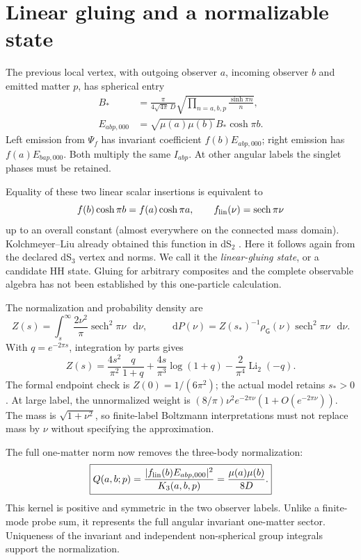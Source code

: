 \documentclass[11pt,a4paper]{article}
\newcommand{\dd}{\mathop{}\!\mathrm d}
\newcommand{\sech}{\operatorname{sech}}
\begin{document}
\newpage
\section{Linear gluing and a normalizable state}
The previous local vertex, with outgoing observer $a$, incoming observer
$b$ and emitted matter $p$, has spherical entry
\begin{align}
 B_*&=\frac{\pi}{4\sqrt{4\pi}\,D}
          \sqrt{\prod_{n=a,b,p}\frac{\sinh\pi n}{n}},\\
 E_{abp,000}&=\sqrt{\mu(a)\mu(b)}B_*\cosh\pi b .
\end{align}
Left emission from $\Psi_f$ has invariant coefficient $f(b)E_{abp,000}$;
right emission has $f(a)E_{bap,000}$. Both multiply the same $I_{abp}$.
At other angular labels the singlet phases must be retained.

Equality of these two linear scalar insertions is equivalent to
\begin{equation}
 f(b)\cosh\pi b=f(a)\cosh\pi a,\qquad
 f_{\rm lin}(\nu)=\sech\pi\nu
\end{equation}
up to an overall constant (almost everywhere on the connected mass domain).
Kolchmeyer--Liu already obtained this function in dS$_2$ \cite{KL}.
Here it follows again from the declared dS$_3$ vertex and norms.
We call it the \emph{linear-gluing state}, or a candidate HH state.
Gluing for arbitrary composites and the complete observable algebra has
not been established by this one-particle calculation.

The normalization and probability density are
\begin{equation}
 Z(s)=\int_s^\infty\frac{2\nu^2}{\pi}\sech^2\pi\nu\,\dd\nu,\qquad
 \dd P(\nu)=Z(s_*)^{-1}\rho_{\mathsf G}(\nu)\sech^2\pi\nu\,\dd\nu .
\end{equation}
With $q=e^{-2\pi s}$, integration by parts gives
\begin{equation}
 Z(s)=\frac{4s^2}{\pi^2}\frac{q}{1+q}
      +\frac{4s}{\pi^3}\log(1+q)
      -\frac{2}{\pi^4}\operatorname{Li}_2(-q).
\end{equation}
The formal endpoint check is $Z(0)=1/(6\pi^2)$; the actual model retains
$s_*>0$. At large label, the unnormalized weight is
$(8/\pi)\nu^2e^{-2\pi\nu}(1+O(e^{-2\pi\nu}))$.
The mass is $\sqrt{1+\nu^2}$, so finite-label Boltzmann interpretations
must not replace mass by $\nu$ without specifying the approximation.

The full one-matter norm now removes the three-body normalization:
\begin{equation}\boxed{
 Q(a,b;p)=\frac{|f_{\rm lin}(b)E_{abp,000}|^2}{K_3(a,b,p)}
         =\frac{\mu(a)\mu(b)}{8D}.}
\end{equation}
This kernel is positive and symmetric in the two observer labels.
Unlike a finite-mode probe sum, it represents the full angular invariant
one-matter sector. Uniqueness of the invariant and independent
non-spherical group integrals support the normalization.
\end{document}
